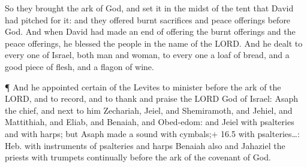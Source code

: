  So they brought the ark of God, and set it in the midst of
the tent that David had pitched for it: and they offered burnt
sacrifices and peace offerings before God.  And when David
had made an end of offering the burnt offerings and the peace offerings,
he blessed the people in the name of the LORD.  And he dealt
to every one of Israel, both man and woman, to every one a loaf of
bread, and a good piece of flesh, and a flagon of wine.

 ¶ And he appointed certain of the Levites to minister
before the ark of the LORD, and to record, and to thank and praise the
LORD God of Israel:  Asaph the chief, and next to him
Zechariah, Jeiel, and Shemiramoth, and Jehiel, and Mattithiah, and
Eliab, and Benaiah, and Obed-edom: and Jeiel with psalteries and with
harps; but Asaph made a sound with cymbals;+ 16.5 with psalteries\ldots:
Heb. with instruments of psalteries and harps  Benaiah also
and Jahaziel the priests with trumpets continually before the ark of the
covenant of God.

